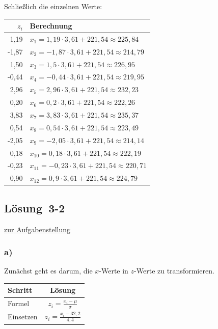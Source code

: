 \documentclass[
  11pt,
  ngerman,
  a4paper,
]{report}
\begin{document}
Schließlich die einzelnen Werte:

\begin{table}[H]
\centering
\begin{tabular}{rl}
\toprule
$z_i$ & Berechnung\\
\midrule
1,19 & $x_{1} = 1{,}19 \cdot 3{,}61 + 221{,}54\approx225{,}84$\\
-1,87 & $x_{2} = -1{,}87 \cdot 3{,}61 + 221{,}54\approx214{,}79$\\
1,50 & $x_{3} = 1{,}5 \cdot 3{,}61 + 221{,}54\approx226{,}95$\\
-0,44 & $x_{4} = -0{,}44 \cdot 3{,}61 + 221{,}54\approx219{,}95$\\
2,96 & $x_{5} = 2{,}96 \cdot 3{,}61 + 221{,}54\approx232{,}23$\\
0,20 & $x_{6} = 0{,}2 \cdot 3{,}61 + 221{,}54\approx222{,}26$\\
3,83 & $x_{7} = 3{,}83 \cdot 3{,}61 + 221{,}54\approx235{,}37$\\
0,54 & $x_{8} = 0{,}54 \cdot 3{,}61 + 221{,}54\approx223{,}49$\\
-2,05 & $x_{9} = -2{,}05 \cdot 3{,}61 + 221{,}54\approx214{,}14$\\
0,18 & $x_{10} = 0{,}18 \cdot 3{,}61 + 221{,}54\approx222{,}19$\\
-0,23 & $x_{11} = -0{,}23 \cdot 3{,}61 + 221{,}54\approx220{,}71$\\
0,90 & $x_{12} = 0{,}9 \cdot 3{,}61 + 221{,}54\approx224{,}79$\\
\bottomrule
\end{tabular}
\end{table}

\hypertarget{loesung-3-2}{%
\subsection{Lösung~3-2}\label{loesung-3-2}}

\protect\hyperlink{aufgabe-3-2}{zur Aufgabenstellung}

\hypertarget{a-9}{%
\subsubsection{a)}\label{a-9}}

Zunächst geht es darum, die \(x\)-Werte in \(z\)-Werte zu transformieren.

\begin{table}[H]
\centering
\begin{tabular}{lc}
\toprule
Schritt & Lösung\\
\midrule
Formel & $z_{i} = \frac{x_{i} - \mu}{\sigma}$\\
Einsetzen & $z_{i} = \frac{x_{i} - 32{,}2}{4{,}4}$\\
\bottomrule
\end{tabular}
\end{table}
\end{document}
